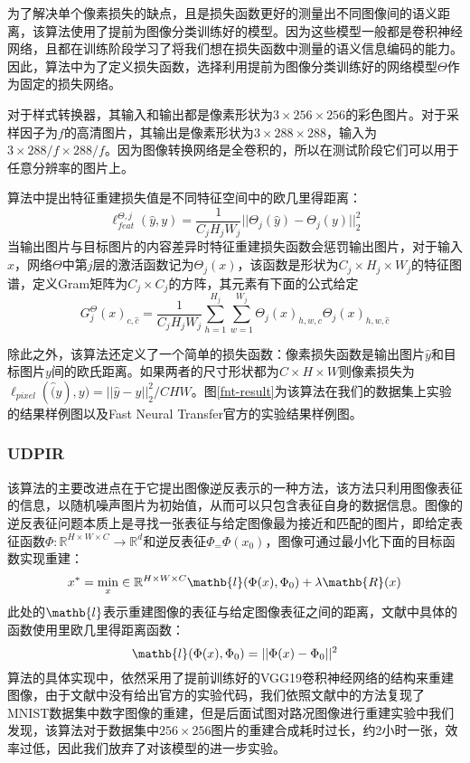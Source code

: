 为了解决单个像素损失的缺点，且是损失函数更好的测量出不同图像间的语义距离，该算法使用了提前为图像分类训练好的模型。因为这些模型一般都是卷积神经网络，且都在训练阶段学习了将我们想在损失函数中测量的语义信息编码的能力。因此，算法中为了定义损失函数，选择利用提前为图像分类训练好的网络模型$\Theta$作为固定的损失网络。

对于样式转换器，其输入和输出都是像素形状为$3\times 256 \times 256$的彩色图片。对于采样因子为$f$的高清图片，其输出是像素形状为$3\times288\times288$，输入为$3\times288/f\times288/f$。因为图像转换网络是全卷积的，所以在测试阶段它们可以用于任意分辨率的图片上。

算法中提出特征重建损失值是不同特征空间中的欧几里得距离：
$$\ell_{feat}^{\Theta,j}(\hat{y},y)=\frac{1}{C_jH_jW_j}||\Theta_j(\hat{y})-\Theta_j(y)||_2^2$$
当输出图片与目标图片的内容差异时特征重建损失函数会惩罚输出图片，对于输入$x$，网络$\Theta$中第$j$层的激活函数记为$\Theta_j(x)$，该函数是形状为$C_j\times H_j\times W_j$的特征图谱，定义Gram矩阵为$C_j\times C_j$的方阵，其元素有下面的公式给定
$$G_j^{\Theta}(x)_{c,\hat{c}}=\frac{1}{C_jH_jW_j}\sum_{h=1}^{H_j}\sum_{w=1}^{W_j}\Theta_j(x)_{h,w,c}\Theta_j(x)_{h,w,\hat{c}}$$

除此之外，该算法还定义了一个简单的损失函数：像素损失函数是输出图片$\hat{y}$和目标图片$y$间的欧氏距离。如果两者的尺寸形状都为$C\times H\times W$则像素损失为$\ell_{pixel}(\hat(y),y)=||\hat{y}-y||_2^2/CHW$。图\ref{fnt-result}为该算法在我们的数据集上实验的结果样例图以及Fast Neural Transfer官方的实验结果样例图。 

\subsubsection{UDPIR} 

 该算法的主要改进点在于它提出图像逆反表示的一种方法，该方法只利用图像表征的信息，以随机噪声图片为初始值，从而可以只包含表征自身的数据信息。图像的逆反表征问题本质上是寻找一张表征与给定图像最为接近和匹配的图片，即给定表征函数$\Phi:\mathbb{R}^{H\times W\times C}\to \mathbb{R}^d$和逆反表征$\Phi_=\Phi(x_0)$，图像可通过最小化下面的目标函数实现重建：
$$x^*=\min_x\in \mathbb{R}^{H\times W\times C}\mathb{l}(\Phi(x),\Phi_0)+\lambda\mathb{R}(x)$$
此处的$\mathb{l}$表示重建图像的表征与给定图像表征之间的距离，文献中具体的函数使用里欧几里得距离函数：
$$\mathb{l}(\Phi(x),\Phi_0)=||\Phi(x)-\Phi_0||^2$$
算法的具体实现中，依然采用了提前训练好的VGG19卷积神经网络的结构来重建图像，由于文献中没有给出官方的实验代码，我们依照文献中的方法复现了MNIST数据集中数字图像的重建，但是后面试图对路况图像进行重建实验中我们发现，该算法对于数据集中$256\times 256$图片的重建合成耗时过长，约2小时一张，效率过低，因此我们放弃了对该模型的进一步实验。

